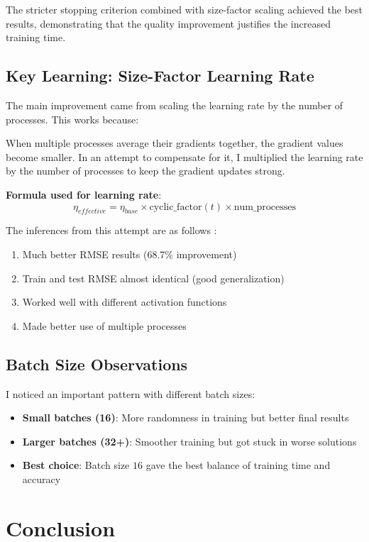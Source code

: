 \documentclass{article}
\begin{document}
The stricter stopping criterion combined with size-factor scaling achieved the best results, demonstrating that the quality improvement justifies the increased training time.

\subsection{Key Learning: Size-Factor Learning Rate}
The main improvement came from scaling the learning rate by the number of processes. This works because:

When multiple processes average their gradients together, the gradient values become smaller. In an attempt to compensate for it, I multiplied the learning rate by the number of processes to keep the gradient updates strong.

\textbf{Formula used for learning rate}:
$$\eta_{effective} = \eta_{base} \times \text{cyclic\_factor}(t) \times \text{num\_processes}$$

The inferences from this attempt are as follows :
\begin{enumerate}
    \item Much better RMSE results (68.7\% improvement)
    \item Train and test RMSE almost identical (good generalization)  
    \item Worked well with different activation functions
    \item Made better use of multiple processes
\end{enumerate}

\subsection{Batch Size Observations}
I noticed an important pattern with different batch sizes:

\begin{itemize}
    \item \textbf{Small batches (16)}: More randomness in training but better final results
    \item \textbf{Larger batches (32+)}: Smoother training but got stuck in worse solutions
    \item \textbf{Best choice}: Batch size $16$ gave the best balance of training time and accuracy
\end{itemize}

\section{Conclusion}
\end{document}
